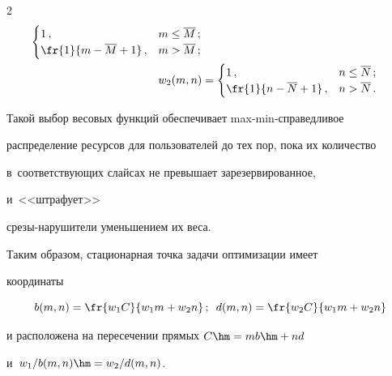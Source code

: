 \begin{multicols}{2}
\begin{align*}
\begin{cases}
1\,, & m\leq \overline{M}\,;\\


\fr{1}{m-\overline{M}+1}\,,& m>\overline{M}\,;


\end{cases}\\


w_2(m,n) &=\begin{cases}


1\,, & n\leq \overline{N}\,;\\


\fr{1}{n-\overline{N}+1}\,, & n>\overline{N}\,.


\end{cases}


\end{align*}


  


  Такой выбор весовых функций обеспечивает max-min-спра\-вед\-ли\-вое 


распределение ресурсов для пользователей до тех пор, пока их количество 


в~соответствующих слайсах не превышает зарезервированное, 


и~<<штрафует>>  


сре\-зы-на\-ру\-ши\-те\-ли уменьшением их веса. 


  


  Таким образом, стационарная точка задачи оптимизации имеет 


координаты


  \begin{equation}


  b(m,n)=\fr{w_1C}{w_1m+w_2n}\,;\enskip


  d(m,n)=\fr{w_2C}{w_1m+w_2n}


  \label{e5-mos}


  \end{equation}


и расположена на пересечении прямых $C\hm= mb\hm+ nd$ 


и~$w_1/b(m,n)\hm= w_2/d(m,n)$.


  


\begin{figure}[b] %


\vspace*{6pt}


    \begin{center}  



\end{center}
\end{figure}
\end{multicols}
